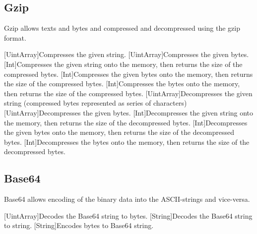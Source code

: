 \subsection{Gzip}

Gzip allows texts and bytes and compressed and decompressed using the gzip format.


\begin{outline}
\1[UintArray]{Compresses the given string.}
\1[UintArray]{Compresses the given bytes.}
\1[Int]{Compresses the given string onto the memory, then returns the size of the compressed bytes.}
\1[Int]{Compresses the given bytes onto the memory, then returns the size of the compressed bytes.}
\1[Int]{Compresses the bytes onto the memory, then returns the size of the compressed bytes.}
\1[UintArray]{Decompresses the given string (compressed bytes represented as series of characters)}
\1[UintArray]{Decompresses the given bytes.}
\1[Int]{Decompresses the given string onto the memory, then returns the size of the decompressed bytes.}
\1[Int]{Decompresses the given bytes onto the memory, then returns the size of the decompressed bytes.}
\1[Int]{Decompresses the bytes onto the memory, then returns the size of the decompressed bytes.}
\end{outline}



\subsection{Base64}

Base64 allows encoding of the binary data into the ASCII-strings and vice-versa.


\begin{outline}
\1[UintArray]{Decodes the Base64 string to bytes.}
\1[String]{Decodes the Base64 string to string.}
\1[String]{Encodes bytes to Base64 string.}
\end{outline}



